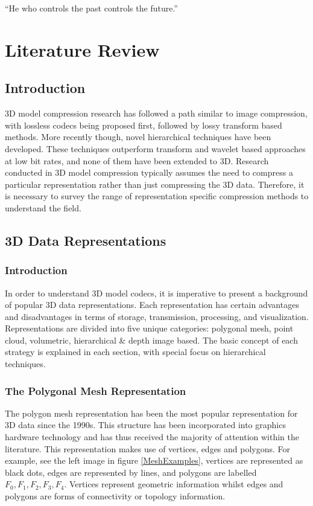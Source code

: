\begin{savequote}[8cm]
  ``He who controls the past controls the future.''
\end{savequote}
\makeatletter
\chapter{Literature Review}

\section{Introduction}

3D model compression research has followed a path similar to image compression, with lossless codecs being proposed first, followed by lossy transform based methods. More recently though, novel hierarchical techniques have been developed. These techniques outperform transform and wavelet based approaches at low bit rates, and none of them have been extended to 3D. Research conducted in 3D model compression typically assumes the need to compress a particular representation rather than just compressing the 3D data. Therefore, it is necessary to survey the range of representation specific compression methods to understand the field.

\section{3D Data Representations}

\subsection{Introduction}

In order to understand 3D model codecs, it is imperative to present a background of popular 3D data representations. Each representation has certain advantages and disadvantages in terms of storage, transmission, processing, and visualization. Representations are divided into five unique categories: polygonal mesh, point cloud, volumetric, hierarchical \& depth image based.  The basic concept of each strategy is explained in each section, with special focus on hierarchical techniques.

\subsection{The Polygonal Mesh Representation}
\label{PolygonalMeshSection}
The polygon mesh representation has been the most popular representation for 3D data since the 1990s. This structure has been incorporated into graphics hardware technology and has thus received the majority of attention within the literature. This representation makes use of vertices, edges and polygons. For example, see the left image in figure \ref{MeshExamples}, vertices are represented as black dots, edges are represented by lines, and polygons are labelled $F_0, F_1, F_2, F_3, F_4$. Vertices represent geometric information whilst edges and polygons are forms of connectivity or topology information.

